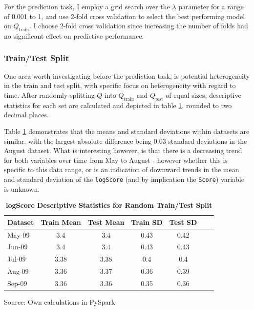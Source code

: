 \documentclass[11pt,preprint, authoryear]{article}
\begin{document}
For the prediction task, I employ a grid search over the \(\lambda\)
parameter for a range of 0.001 to 1, and use 2-fold cross validation to
select the best performing model on \(Q_\text{train}\). I choose 2-fold
cross validation since increasing the number of folds had no significant
effect on predictive performance.

\newpage

\subsubsection{Train/Test Split}\label{traintest-split}

One area worth investigating before the prediction task, is potential
heterogeneity in the train and test split, with specific focus on
heterogeneity with regard to time. After randomly splitting \(Q\) into
\(Q_\text{train}\) and \(Q_\text{test}\) of equal sizes, descriptive
statistics for each set are calculated and depicted in table
\ref{tab:rand_tr_te}, rounded to two decimal places.

Table \ref{tab:rand_tr_te} demonstrates that the means and standard
deviations within datasets are similar, with the largest absolute
difference being 0.03 standard deviations in the August dataset. What is
interesting however, is that there is a decreasing trend for both
variables over time from May to August - however whether this is
specific to this data range, or is an indication of downward trends in
the mean and standard deviation of the \texttt{logScore} (and by
implication the \texttt{Score}) variable is unknown. \newline

\footnotesize

\begin{longtable}[htbp] {@{} lcccccc @{}} 
\caption{\textbf{logScore Descriptive Statistics for Random Train/Test Split}} 
\label{tab:rand_tr_te} \\
\toprule
\textbf{Dataset} &  \textbf{Train Mean} &  \textbf{Test Mean} &  \textbf{Train SD} &  \textbf{Test SD} \\
\midrule
May-09 & 3.4 & 3.4 & 0.43 & 0.42 \\
Jun-09 & 3.4 & 3.4 & 0.43 & 0.43 \\
Jul-09 & 3.38 & 3.38 & 0.4 & 0.4 \\
Aug-09 & 3.36 & 3.37 & 0.36 & 0.39 \\
Sep-09 & 3.36 & 3.36 & 0.35 & 0.36 \\
\bottomrule
\end{longtable}\begin{center} Source: Own calculations in PySpark\end{center}
\end{document}
